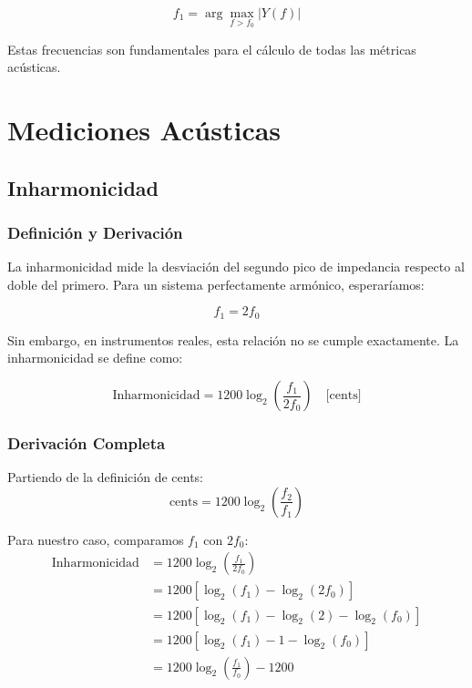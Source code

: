 \documentclass[12pt,a4paper,twocolumn]{article}
\newcommand{\admittance}{Y}
\newcommand{\freqzero}{f_0}
\newcommand{\freqone}{f_1}
\begin{document}
\begin{equation}
\freqone = \arg\max_{f > \freqzero} |\admittance(f)|
\label{eq:antiresonancia_2}
\end{equation}

Estas frecuencias son fundamentales para el cálculo de todas las métricas acústicas.

\section{Mediciones Acústicas}

\subsection{Inharmonicidad}

\subsubsection{Definición y Derivación}

La inharmonicidad mide la desviación del segundo pico de impedancia respecto al doble del primero. Para un sistema perfectamente armónico, esperaríamos:

\begin{equation}
\freqone = 2\freqzero
\label{eq:armonico_ideal}
\end{equation}

Sin embargo, en instrumentos reales, esta relación no se cumple exactamente. La inharmonicidad se define como:

\begin{equation}
\text{Inharmonicidad} = 1200 \log_2\left(\frac{\freqone}{2\freqzero}\right) \quad \text{[cents]}
\label{eq:inharmonicidad}
\end{equation}

\subsubsection{Derivación Completa}

Partiendo de la definición de cents:
\begin{equation}
\text{cents} = 1200 \log_2\left(\frac{f_2}{f_1}\right)
\label{eq:cents_def}
\end{equation}

Para nuestro caso, comparamos $\freqone$ con $2\freqzero$:
\begin{align}
\text{Inharmonicidad} &= 1200 \log_2\left(\frac{\freqone}{2\freqzero}\right) \\
&= 1200 \left[\log_2(\freqone) - \log_2(2\freqzero)\right] \\
&= 1200 \left[\log_2(\freqone) - \log_2(2) - \log_2(\freqzero)\right] \\
&= 1200 \left[\log_2(\freqone) - 1 - \log_2(\freqzero)\right] \\
&= 1200 \log_2\left(\frac{\freqone}{\freqzero}\right) - 1200
\label{eq:inharmonicidad_deriv}
\end{align}
\end{document}
